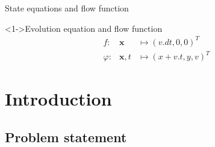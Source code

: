 \documentclass{beamer}
\begin{document}
            \begin{frame}{State equations and flow function}
                \begin{block}<1->{Evolution equation and flow function}
                    \begin{eqnarray}
                        f:& \mathbf{x} &\mapsto (v.dt, 0, 0)^T \\
                        \varphi:& \mathbf{x}, t &\mapsto (x + v.t, y, v)^T
                    \end{eqnarray}
                \end{block}
            \end{frame}

            



    \section{Introduction}

        \subsection{Problem statement}
\end{document}
